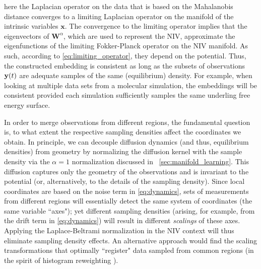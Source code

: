 here the Laplacian operator on the data that is based on the Mahalanobis distance converges to a limiting Laplacian operator on the
manifold of the intrinsic variables $\mathbf{x}$.
%
The convergence to the limiting operator implies that the eigenvectors of $\mathbf{W}^{\alpha}$, which are used to represent the NIV, approximate the eigenfunctions of the limiting Fokker-Planck operator on the NIV manifold.
%
As such, according to \eqref{eq:limiting_operator}, they depend on the potential.
%
Thus, the constructed embedding is consistent as long as the subsets of observations $\mathbf{y}(t)$ are
adequate samples of the same (equilibrium) density.
%
For example, when looking at multiple data sets from a molecular simulation, the embeddings will be consistent provided each simulation sufficiently samples the same underling free energy surface.

In order to merge observations from different regions,
the fundamental question is, to what extent the respective sampling densities affect the coordinates we obtain.
%
In principle, we can decouple diffusion dynamics (and thus, equilibrium densities)
from geometry by normalizing the diffusion kernel with the sample density via the $\alpha=1$ normalization discussed in \sec~\ref{sec:manifold_learning}.
%
%
%
This diffusion captures only the geometry of the observations and is invariant to the potential (or, alternatively,
to the details of the sampling density).
%
Since local coordinates are based on the noise term in \eqref{eq:dynamics}, sets of measurements from different regions
will essentially detect the same system of coordinates (the same variable ``axes"); 
yet different sampling densities (arising, for example,
from the drift term in \eqref{eq:dynamics}) will result in different {\em scalings} of these axes.
%
Applying the Laplace-Beltrami normalization in the NIV context will thus eliminate sampling density effects.
%
An alternative approach would find the scaling transformations that optimally ``register"
data sampled from common regions (in the spirit of histogram reweighting \cite{ferrenberg1988new}).

